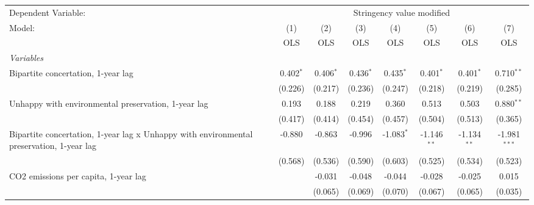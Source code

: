 
\begingroup
\centering
\begin{tabular}{lccccccc}
   \toprule
   Dependent Variable: & \multicolumn{7}{c}{Stringency value modified}\\
   Model:                                                                                   & (1)         & (2)         & (3)           & (4)           & (5)           & (6)           & (7)\\  
                                                                                            &  OLS        & OLS         & OLS           & OLS           & OLS           & OLS           & OLS\\  
   \midrule
   \emph{Variables}\\
   Bipartite concertation, 1-year lag                                                       & 0.402$^{*}$ & 0.406$^{*}$ & 0.436$^{*}$   & 0.435$^{*}$   & 0.401$^{*}$   & 0.401$^{*}$   & 0.710$^{**}$\\   
                                                                                            & (0.226)     & (0.217)     & (0.236)       & (0.247)       & (0.218)       & (0.219)       & (0.285)\\   
   Unhappy with environmental preservation, 1-year lag                                      & 0.193       & 0.188       & 0.219         & 0.360         & 0.513         & 0.503         & 0.880$^{**}$\\   
                                                                                            & (0.417)     & (0.414)     & (0.454)       & (0.457)       & (0.504)       & (0.513)       & (0.365)\\   
   Bipartite concertation, 1-year lag x Unhappy with environmental preservation, 1-year lag & -0.880      & -0.863      & -0.996        & -1.083$^{*}$  & -1.146$^{**}$ & -1.134$^{**}$ & -1.981$^{***}$\\   
                                                                                            & (0.568)     & (0.536)     & (0.590)       & (0.603)       & (0.525)       & (0.534)       & (0.523)\\   
   CO2 emissions per capita, 1-year lag                                                     &             & -0.031      & -0.048        & -0.044        & -0.028        & -0.025        & 0.015\\   
                                                                                            &             & (0.065)     & (0.069)       & (0.070)       & (0.067)       & (0.065)       & (0.035)\\   

\end{tabular}
